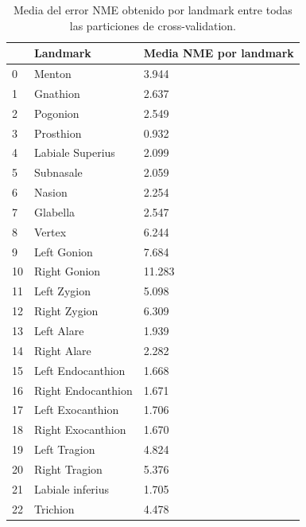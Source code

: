             \begin{table}[!ht]
                \centering
                \caption{Media del error NME obtenido por landmark entre todas las particiones de cross-validation.}
                \begin{tabular}{|l|l|l|}
                \hline
                    ~ & Landmark & Media NME por landmark \\ \hline
                    0 & Menton & 3.944 \\ \hline
                    1 & Gnathion & 2.637 \\ \hline
                    2 & Pogonion & 2.549 \\ \hline
                    3 & Prosthion & 0.932 \\ \hline
                    4 & Labiale Superius & 2.099 \\ \hline
                    5 & Subnasale & 2.059 \\ \hline
                    6 & Nasion & 2.254 \\ \hline
                    7 & Glabella & 2.547 \\ \hline
                    8 & Vertex & 6.244 \\ \hline
                    9 & Left Gonion & 7.684 \\ \hline
                    10 & Right Gonion & 11.283 \\ \hline
                    11 & Left Zygion & 5.098 \\ \hline
                    12 & Right Zygion & 6.309 \\ \hline
                    13 & Left Alare & 1.939 \\ \hline
                    14 & Right Alare & 2.282 \\ \hline
                    15 & Left Endocanthion & 1.668 \\ \hline
                    16 & Right Endocanthion & 1.671 \\ \hline
                    17 & Left Exocanthion & 1.706 \\ \hline
                    18 & Right Exocanthion & 1.670 \\ \hline
                    19 & Left Tragion & 4.824 \\ \hline
                    20 & Right Tragion & 5.376 \\ \hline
                    21 & Labiale inferius & 1.705 \\ \hline
                    22 & Trichion & 4.478 \\ \hline

\end{tabular}
\end{table}
